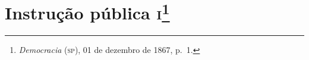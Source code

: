 
\chapter{Instrução pública \textsc{i}\footnote{\emph{Democracia} (\textsc{sp}),
  01 de dezembro de 1867, p.~1.}}

